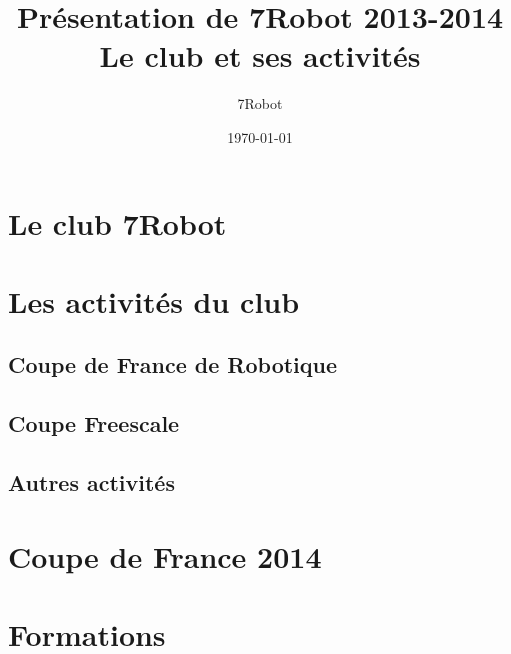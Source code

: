 \documentclass{beamer}
\title[Présentation de 7Robot 2013-2014]{Présentation de 7Robot 2013-2014\\ Le club et ses activités}
\author{7Robot}
\date{\today}
\begin{document}
\begin{frame}
  \titlepage
\end{frame}

\begin{frame}
  \tableofcontents
\end{frame}

\section{Le club 7Robot}
  

\section{Les activités du club}
  \subsection{Coupe de France de Robotique}
    
  \subsection{Coupe Freescale}
    
  \subsection{Autres activités}
    

\section{Coupe de France 2014}
  
  
\section{Formations}
  
\end{document}
